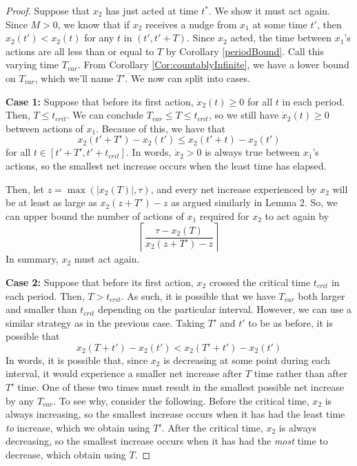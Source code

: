 \documentclass[preprint,12pt]{elsarticle}
\newcommand{\lt}{\left}
\newcommand{\rt}{\right}
\begin{document}
\begin{proof} Suppose that $x_2$ has just acted at time $t^*$. We show it must act again. Since $M > 0$, we know that if $x_2$ receives a nudge from $x_1$ at some time $t'$, then $x_2(t') < x_2(t)$ for any $t$ in $(t', t' +T )$. Since $x_2$ acted, the time between $x_1$'s actions are all less than or equal to $T$ by Corollary \ref{periodBound}. Call this varying time $T_{var}$. From Corollary \ref{Cor:countablyInfinite}, we have a lower bound on $T_{var}$, which we'll name $T'$. We now can split into cases. 

\textbf{Case 1:} Suppose that before its first action, $\dot x_2(t) \geq 0$ for all $t$ in each period. Then, $T \leq t_{crit}$. We can conclude $T_{var} \leq T \leq t_{crit}$, so we still have $\dot x_2(t) \geq 0$ between actions of $x_1$. Because of this, we have that \[x_2(t' + T') - x_2(t') \leq x_2(t' +t) - x_2(t')\] for all $t \in [t' + T', t' + t_{crit}]$. In words, $\dot x_2 >0$ is always true between $x_1$'s actions, so the smallest net increase occurs when the least time has elapsed.

Then, let $z = \max(|x_2(T)|, \tau)$, and every net increase experienced by $x_2$ will be at least as large as $x_2(z + T') - z$ as argued similarly in Lemma 2. So, we can upper bound the number of actions of $x_1$ required for $x_2$ to act again by \[
    \lt \lceil \frac{\tau - x_2(T)}{x_2(z + T') - z} \rt \rceil
    \]
In summary, $x_2$ must act again. 

\textbf{Case 2:} Suppose that before its first action, $x_2$ crossed the critical time $t_{crit}$ in each period. Then, $T > t_{crit}$. As such, it is possible that we have $T_{var}$ both larger and smaller than $t_{crit}$ depending on the particular interval. However, we can use a similar strategy as in the previous case. Taking $T'$ and $t'$ to be as before, it is possible that \[x_2(T + t') - x_2(t') < x_2(T' + t') - x_2(t')\]
In words, it is possible that, since $x_2$ is decreasing at some point during each interval, it would experience a smaller net increase after $T$ time rather than after $T'$ time. One of these two times must result in the smallest possible net increase by any $T_{var}$. To see why, consider the following. Before the critical time, $x_2$ is always increasing, so the smallest increase occurs when it has had the least time \textit{to} increase, which we obtain using $T'$. After the critical time, $x_2$ is always decreasing, so the smallest increase occurs when it has had the \textit{most} time to decrease, which obtain using $T$. 


\end{proof}
\end{document}

